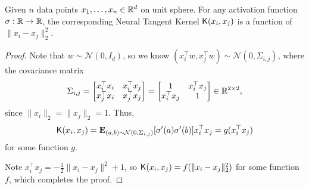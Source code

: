\begin{lemma}
Given $n$ data points $x_1, \dots, x_n \in {\mathbb R}^d$ on unit sphere. For any activation function $\sigma : {\mathbb R} \rightarrow {\mathbb R}$, the corresponding Neural Tangent Kernel $\mathsf{K}(x_i,x_j)$ is a function of $\| x_i - x_j \|_2^2$.
\end{lemma}
\begin{proof}
Note that $w\sim \mathcal{N}(0,I_d)$, so we know $(x_i^\top w,x_j^\top w)\sim\mathcal{N}(0, \Sigma_{i,j})$, where the covariance matrix 
\begin{align*}
\Sigma_{i,j}=\begin{bmatrix}
	x_i^\top x_i & x_i^\top x_j\\
	x_j^\top x_i & x_j^\top x_j
\end{bmatrix} = \begin{bmatrix}
	1 & x_i^\top x_j\\
	x_i^\top x_j & 1
\end{bmatrix} \in {\mathbb R}^{2 \times 2},
\end{align*}
since $\|x_i\|_2=\|x_j\|_2 = 1$. 
Thus, 
\begin{align*}
\mathsf{K}(x_i,x_j) = \mathbf{E}_{(a,b)\sim\mathcal{N}(0,\Sigma_{i,j})}[\sigma'(a)\sigma'(b)]x_i^\top x_j = g(x_i^\top x_j)
\end{align*}
for some function $g$.

 Note $x_i^\top x_j = -\frac{1}{2}\|x_i-x_j\|^2 + 1$, so $\mathsf{K}(x_i,x_j)=f( \| x_i-x_j \|_2^2 )$ for some function $f$, which completes the proof.
\end{proof}


